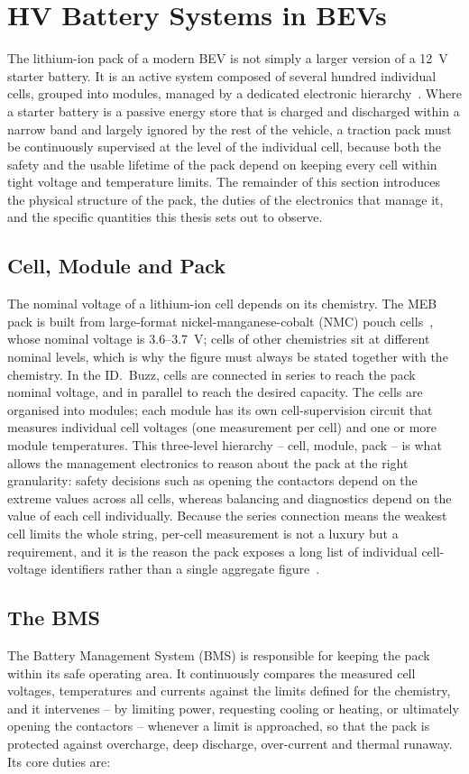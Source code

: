 \documentclass[11pt,a4paper,oneside,parskip=half]{scrreprt}
\begin{document}
\section{HV Battery Systems in BEVs}
\label{sec:hvbattery}
The lithium-ion pack of a modern BEV is not simply a larger version of a 12~V starter battery. It is an active system composed of several hundred individual cells, grouped into modules, managed by a dedicated electronic hierarchy~\cite{plett2015}. Where a starter battery is a passive energy store that is charged and discharged within a narrow band and largely ignored by the rest of the vehicle, a traction pack must be continuously supervised at the level of the individual cell, because both the safety and the usable lifetime of the pack depend on keeping every cell within tight voltage and temperature limits. The remainder of this section introduces the physical structure of the pack, the duties of the electronics that manage it, and the specific quantities this thesis sets out to observe.

\subsection{Cell, Module and Pack}
The nominal voltage of a lithium-ion cell depends on its chemistry. The MEB pack is built from large-format nickel-manganese-cobalt (NMC) pouch cells~\cite{guenter2022}, whose nominal voltage is 3.6--3.7~V; cells of other chemistries sit at different nominal levels, which is why the figure must always be stated together with the chemistry. In the ID.~Buzz, cells are connected in series to reach the pack nominal voltage, and in parallel to reach the desired capacity. The cells are organised into modules; each module has its own cell-supervision circuit that measures individual cell voltages (one measurement per cell) and one or more module temperatures. This three-level hierarchy -- cell, module, pack -- is what allows the management electronics to reason about the pack at the right granularity: safety decisions such as opening the contactors depend on the extreme values across all cells, whereas balancing and diagnostics depend on the value of each cell individually. Because the series connection means the weakest cell limits the whole string, per-cell measurement is not a luxury but a requirement, and it is the reason the pack exposes a long list of individual cell-voltage identifiers rather than a single aggregate figure~\cite{plett2015}.

\subsection{The BMS}
The Battery Management System (BMS) is responsible for keeping the pack within its safe operating area. It continuously compares the measured cell voltages, temperatures and currents against the limits defined for the chemistry, and it intervenes -- by limiting power, requesting cooling or heating, or ultimately opening the contactors -- whenever a limit is approached, so that the pack is protected against overcharge, deep discharge, over-current and thermal runaway. Its core duties are:
\end{document}

